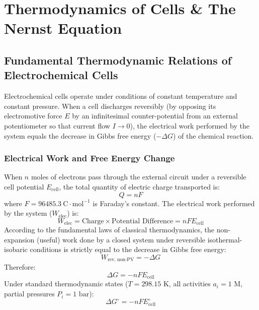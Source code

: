 \chapter{Thermodynamics of Cells \& The Nernst Equation}
\label{chap:thermodynamics_nernst}

\section{Fundamental Thermodynamic Relations of Electrochemical Cells}

Electrochemical cells operate under conditions of constant temperature and constant pressure. When a cell discharges reversibly (by opposing its electromotive force $E$ by an infinitesimal counter-potential from an external potentiometer so that current flow $I \to 0$), the electrical work performed by the system equals the decrease in Gibbs free energy ($-\Delta G$) of the chemical reaction.

\subsection{Electrical Work and Free Energy Change}
When $n$ moles of electrons pass through the external circuit under a reversible cell potential $E_{\text{cell}}$, the total quantity of electric charge transported is:
\begin{equation}
    Q = n F
\end{equation}
where $F = 96485.3\ \text{C}\cdot\text{mol}^{-1}$ is Faraday's constant.
The electrical work performed by the system ($W_{\text{elec}}$) is:
\begin{equation}
    W_{\text{elec}} = \text{Charge} \times \text{Potential Difference} = n F E_{\text{cell}}
\end{equation}
According to the fundamental laws of classical thermodynamics, the non-expansion (useful) work done by a closed system under reversible isothermal-isobaric conditions is strictly equal to the decrease in Gibbs free energy:
\begin{equation}
    W_{\text{rev, non-PV}} = -\Delta G
\end{equation}
Therefore:
\begin{equation}
    \boxed{\Delta G = -n F E_{\text{cell}}}
\end{equation}
Under standard thermodynamic states ($T = 298.15\text{ K}$, all activities $a_i = 1\text{ M}$, partial pressures $P_i = 1\text{ bar}$):
\begin{equation}
    \boxed{\Delta G^\circ = -n F E^\circ_{\text{cell}}}
\end{equation}

